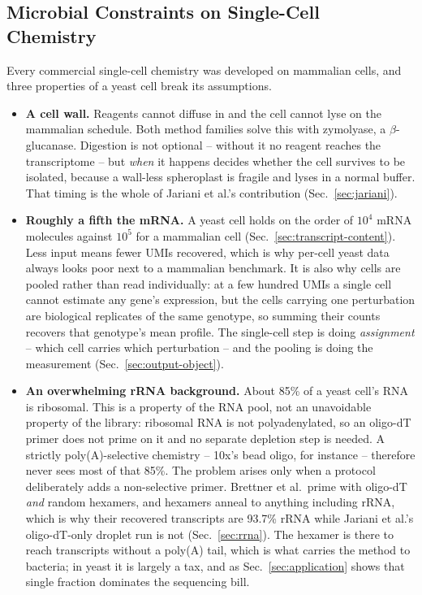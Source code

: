 \subsection{Microbial Constraints on Single-Cell Chemistry}
\label{sec:why-hard}

Every commercial single-cell chemistry was developed on mammalian cells, and
three properties of a yeast cell break its assumptions.

\begin{itemize}[leftmargin=1.2em,itemsep=1pt,topsep=2pt]
  \item \textbf{A cell wall.} Reagents cannot diffuse in and the cell cannot lyse
    on the mammalian schedule. Both method families solve this with zymolyase, a
    $\beta$-glucanase. Digestion is not optional -- without it no reagent reaches
    the transcriptome -- but \emph{when} it happens decides whether the cell
    survives to be isolated, because a wall-less spheroplast is fragile and lyses
    in a normal buffer. That timing is the whole of Jariani et al.'s contribution
    (Sec.~\ref{sec:jariani}).
  \item \textbf{Roughly a fifth the mRNA.} A yeast cell holds on the order of
    $10^{4}$ mRNA molecules against $10^{5}$ for a mammalian cell
    (Sec.~\ref{sec:transcript-content}). Less input means fewer UMIs recovered,
    which is why per-cell yeast data always looks poor next to a mammalian
    benchmark. It is also why cells are pooled rather than read individually: at
    a few hundred UMIs a single cell cannot estimate any gene's expression, but
    the cells carrying one perturbation are biological replicates of the same
    genotype, so summing their counts recovers that genotype's mean profile. The
    single-cell step is doing \emph{assignment} -- which cell carries which
    perturbation -- and the pooling is doing the measurement
    (Sec.~\ref{sec:output-object}).
  \item \textbf{An overwhelming rRNA background.} About 85\% of a yeast cell's
    RNA is ribosomal. This is a property of the RNA pool, not an unavoidable
    property of the library: ribosomal RNA is not polyadenylated, so an
    oligo-dT primer does not prime on it and no separate depletion step is
    needed. A strictly poly(A)-selective chemistry -- 10x's bead oligo, for
    instance -- therefore never sees most of that 85\%. The problem arises only
    when a protocol deliberately adds a non-selective primer. Brettner et al.\
    prime with oligo-dT \emph{and} random hexamers, and hexamers anneal to
    anything including rRNA, which is why their recovered transcripts are 93.7\%
    rRNA while Jariani et al.'s oligo-dT-only droplet run is not
    (Sec.~\ref{sec:rrna}). The hexamer is there to reach transcripts without a
    poly(A) tail, which is what carries the method to bacteria; in yeast it is
    largely a tax, and as Sec.~\ref{sec:application} shows that single fraction
    dominates the sequencing bill.
\end{itemize}

